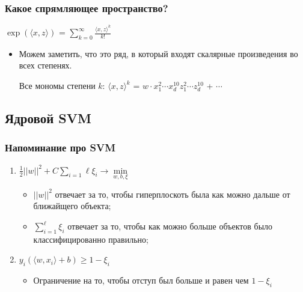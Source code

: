         \subsubsection{Какое спрямляющее пространство?}

            \begin{center}
            \Large
                $\exp(\langle x, z \rangle)$ = $\sum\limits_{k = 0}^\infty \frac{\langle x, z\rangle^k}{k! }$
            \end{center}

            \begin{itemize}
                \item Можем заметить, что это ряд, в который входят скалярные произведения во всех степенях.
                \begin{center}
                    Все мономы степени $k$: \quad $\langle x, z \rangle^k$ = $w\cdot x_1^2 \cdots x_d^{10}z_1^2 \cdots z_d^{10}$ + $\cdots$
                \end{center}
            \end{itemize}

    \subsection{Ядровой SVM}

        \subsubsection{Напоминание про SVM}

            \begin{enumerate}

            \item{$\frac{1}{2}||w||^2 + C \sum\limits_{i = 1}\ell\xi_i \longrightarrow \min\limits_{w, b, \xi}$}

                \begin{itemize}
                    \item $||w||^2$ отвечает за то, чтобы гиперплоскоть была как можно дальше от ближайщего объекта;
    
                    \item $\sum\limits_{i = 1}^\ell\xi_i$ отвечает за то, чтобы как можно больше объектов было классифицированно правильно;
                \end{itemize}
            
            \item{$y_i(\langle w, x_i \rangle + b) \geq 1 - \xi_i$}
                \begin{itemize}
                    \item Ограничение на то, чтобы отступ был больше и равен чем $1 - \xi_i$
                \end{itemize}
            
            \end{enumerate}

